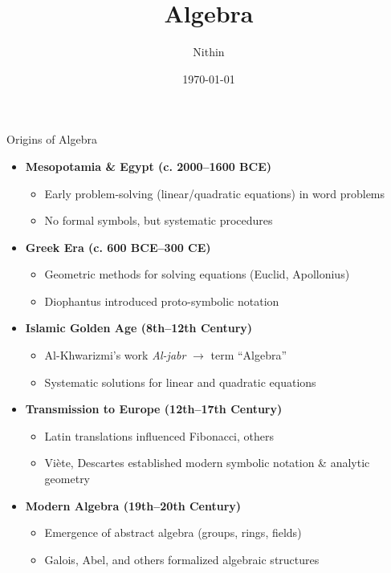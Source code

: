 \documentclass{beamer}
\title{Algebra}
\author{Nithin}
\institute{Maveric Systems}
\date{\today}
\begin{document}
\frame{\titlepage}

\begin{frame}{Origins of Algebra}
    \begin{itemize}
      \item \textbf{Mesopotamia \& Egypt (c. 2000–1600 BCE)}
        \begin{itemize}
          \item Early problem-solving (linear/quadratic equations) in word problems
          \item No formal symbols, but systematic procedures
        \end{itemize}
  
      \item \textbf{Greek Era (c. 600 BCE–300 CE)}
        \begin{itemize}
          \item Geometric methods for solving equations (Euclid, Apollonius)
          \item Diophantus introduced proto-symbolic notation
        \end{itemize}
  
      \item \textbf{Islamic Golden Age (8th–12th Century)}
        \begin{itemize}
          \item Al-Khwarizmi’s work \emph{Al-jabr} $\rightarrow$ term “Algebra”
          \item Systematic solutions for linear and quadratic equations
        \end{itemize}
  
      \item \textbf{Transmission to Europe (12th–17th Century)}
        \begin{itemize}
          \item Latin translations influenced Fibonacci, others
          \item Viète, Descartes established modern symbolic notation \& analytic geometry
        \end{itemize}
  
      \item \textbf{Modern Algebra (19th–20th Century)}
        \begin{itemize}
          \item Emergence of abstract algebra (groups, rings, fields)
          \item Galois, Abel, and others formalized algebraic structures
        \end{itemize}
    \end{itemize}
  \end{frame}
\end{document}
